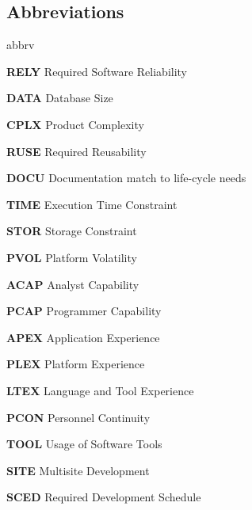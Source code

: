 \subsection{Abbreviations}
	\begin{labeling}{abbrv}
		\item[\textbf{RELY}] Required Software Reliability
		\item[\textbf{DATA}] Database Size
		\item[\textbf{CPLX}] Product Complexity
		\item[\textbf{RUSE}] Required Reusability
		\item[\textbf{DOCU}] Documentation match to life-cycle needs
		\item[\textbf{TIME}] Execution Time Constraint
		\item[\textbf{STOR}] Storage Constraint
		\item[\textbf{PVOL}] Platform Volatility
		\item[\textbf{ACAP}] Analyst Capability
		\item[\textbf{PCAP}] Programmer Capability
		\item[\textbf{APEX}] Application Experience
		\item[\textbf{PLEX}] Platform Experience
		\item[\textbf{LTEX}] Language and Tool Experience
		\item[\textbf{PCON}] Personnel Continuity
		\item[\textbf{TOOL}] Usage of Software Tools
		\item[\textbf{SITE}] Multisite Development
		\item[\textbf{SCED}] Required Development Schedule
	\end{labeling}